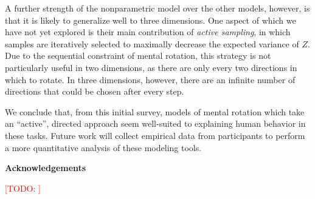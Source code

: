 \documentclass{article} %
\newcommand{\TODO}[1]{\textcolor{red}{[TODO: #1]}}
\begin{document}
A further strength of the nonparametric model over the other models,
however, is that it is likely to generalize well to three
dimensions. One aspect of \cite{Osborne:2012tm} which we have not yet
explored is their main contribution of \textit{active sampling}, in
which samples are iteratively selected to maximally decrease the
expected variance of $Z$. Due to the sequential constraint of mental
rotation, this strategy is not particularly useful in two dimensions,
as there are only every two directions in which to rotate. In three
dimensions, however, there are an infinite number of directions that
could be chosen after every step.

We conclude that, from this initial survey, models of mental rotation
which take an ``active'', directed approach seem well-suited to
explaining human behavior in these tasks. Future work will collect
empirical data from participants to perform a more quantitative
analysis of these modeling tools.

\textbf{Acknowledgements}

\TODO{}

\renewcommand\refname{\normalsize{References}}


\end{document}
